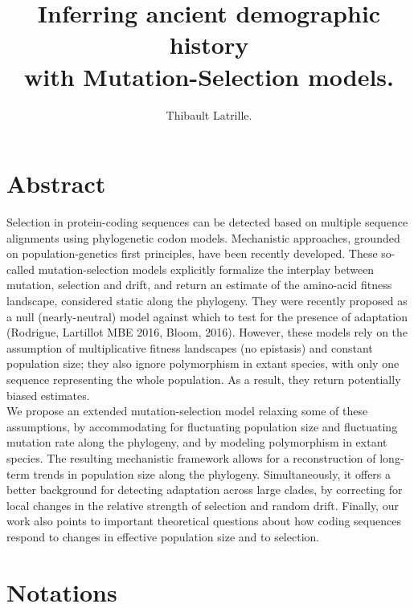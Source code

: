 \documentclass{article}
\author{Thibault Latrille.}
\title{Inferring ancient demographic history \\with Mutation-Selection models.}
\begin{document}
\maketitle
\section*{Abstract}

Selection in protein-coding sequences can be detected based on multiple sequence alignments using phylogenetic codon models.
Mechanistic approaches, grounded on population-genetics first principles, have been recently developed.
These so-called mutation-selection models explicitly formalize the interplay between mutation, selection and drift, and return an estimate of the amino-acid fitness landscape, considered static along the phylogeny.
They were recently proposed as a null (nearly-neutral) model against which to test for the presence of adaptation (Rodrigue, Lartillot MBE 2016, Bloom, 2016).
However, these models rely on the assumption of multiplicative fitness landscapes (no epistasis) and constant population size; they also ignore polymorphism in extant species, with only one sequence representing the whole population.
As a result, they return potentially biased estimates.\\
	
We propose an extended mutation-selection model relaxing some of these assumptions, by accommodating for fluctuating population size and fluctuating mutation rate along the phylogeny, and by modeling polymorphism in extant species.
The resulting mechanistic framework allows for a reconstruction of long-term trends in population size along the phylogeny.
Simultaneously, it offers a better background for detecting adaptation across large clades, by correcting for local changes in the relative strength of selection and random drift.
Finally, our work also points to important theoretical questions about how coding sequences respond to changes in effective population size and to selection.

\newpage
\tableofcontents
\newpage

\section{Notations}
\end{document}
